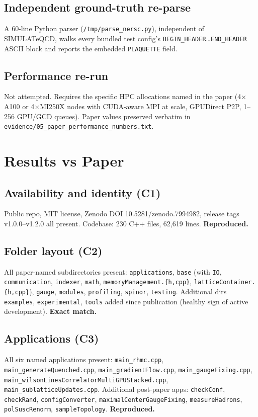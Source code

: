 \documentclass[11pt]{article}
\begin{document}
\subsection{Independent ground-truth re-parse}
A 60-line Python parser (\texttt{/tmp/parse\_nersc.py}), independent of SIMULATeQCD, walks every bundled test config's \texttt{BEGIN\_HEADER}\ldots\texttt{END\_HEADER} ASCII block and reports the embedded \texttt{PLAQUETTE} field.

\subsection{Performance re-run}
Not attempted. Requires the specific HPC allocations named in the paper (4$\times$A100 or 4$\times$MI250X nodes with CUDA-aware MPI at scale, GPUDirect P2P, 1--256 GPU/GCD queues). Paper values preserved verbatim in \texttt{evidence/05\_paper\_performance\_numbers.txt}.

\section{Results vs Paper}\label{sec:results}

\subsection{Availability and identity (C1)}
Public repo, MIT license, Zenodo DOI 10.5281/zenodo.7994982, release tags v1.0.0--v1.2.0 all present. Codebase: 230 C++ files, 62{,}619 lines. \textbf{Reproduced.}

\subsection{Folder layout (C2)}
All paper-named subdirectories present: \texttt{applications}, \texttt{base} (with \texttt{IO}, \texttt{communication}, \texttt{indexer}, \texttt{math}, \texttt{memoryManagement.\{h,cpp\}}, \texttt{latticeContainer.\{h,cpp\}}), \texttt{gauge}, \texttt{modules}, \texttt{profiling}, \texttt{spinor}, \texttt{testing}. Additional dirs \texttt{examples}, \texttt{experimental}, \texttt{tools} added since publication (healthy sign of active development). \textbf{Exact match.}

\subsection{Applications (C3)}
All six named applications present: \texttt{main\_rhmc.cpp}, \texttt{main\_generateQuenched.cpp}, \texttt{main\_gradientFlow.cpp}, \texttt{main\_gaugeFixing.cpp}, \texttt{main\_wilsonLinesCorrelatorMultiGPUStacked.cpp}, \texttt{main\_sublatticeUpdates.cpp}. Additional post-paper apps: \texttt{checkConf}, \texttt{checkRand}, \texttt{configConverter}, \texttt{maximalCenterGaugeFixing}, \texttt{measureHadrons}, \texttt{polSuscRenorm}, \texttt{sampleTopology}. \textbf{Reproduced.}
\end{document}
